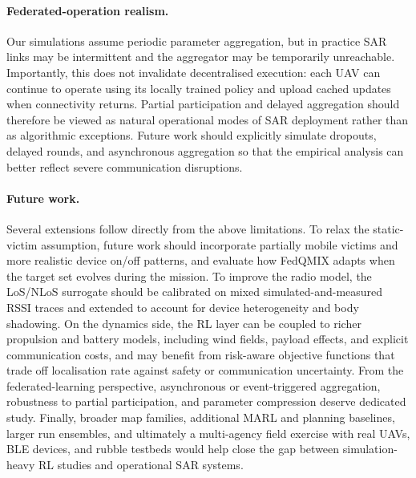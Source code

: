 \documentclass[drones,article,accept,pdftex,moreauthors]{Definitions/mdpi}
\begin{document}
\paragraph{Federated-operation realism.}
Our simulations assume periodic parameter aggregation, but in practice SAR links
may be intermittent and the aggregator may be temporarily unreachable.
Importantly, this does not invalidate decentralised execution: each UAV can
continue to operate using its locally trained policy and upload cached updates
when connectivity returns. Partial participation and delayed aggregation should
therefore be viewed as natural operational modes of SAR deployment rather than
as algorithmic exceptions. Future work should explicitly simulate dropouts,
delayed rounds, and asynchronous aggregation so that the empirical analysis can
better reflect severe communication disruptions.

\paragraph{Future work.}
Several extensions follow directly from the above limitations. To relax the
static-victim assumption, future work should incorporate partially mobile
victims and more realistic device on/off patterns, and evaluate how FedQMIX
adapts when the target set evolves during the mission. To improve the radio
model, the LoS/NLoS surrogate should be calibrated on mixed
simulated-and-measured RSSI traces and extended to account for device
heterogeneity and body shadowing. On the dynamics side, the RL layer can be
coupled to richer propulsion and battery models, including wind fields, payload
effects, and explicit communication costs, and may benefit from risk-aware
objective functions that trade off localisation rate against safety or
communication uncertainty. From the federated-learning perspective, asynchronous
or event-triggered aggregation, robustness to partial participation, and
parameter compression deserve dedicated study. Finally, broader map families,
additional MARL and planning baselines, larger run ensembles, and ultimately a
multi-agency field exercise with real UAVs, BLE devices, and rubble testbeds
would help close the gap between simulation-heavy RL studies and operational SAR
systems.

\vspace{6pt} 

\end{document}
